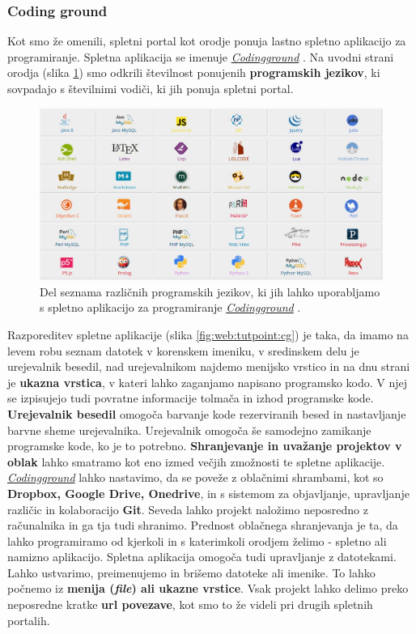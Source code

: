 \subsubsection{Coding ground}
\label{sec:coding_ground}

Kot smo že omenili, spletni portal kot orodje ponuja lastno spletno
aplikacijo za programiranje. Spletna aplikacija se imenuje
\emph{\href{http://www.tutorialspoint.com/codingground.htm}{Codingground}}
\cite{web:tutorialspoint:codingground}. Na uvodni strani orodja (slika
\ref{fig:web:tutpoint:cg-pl}) smo odkrili številnost ponujenih
\textbf{programskih jezikov}, ki sovpadajo s številnimi vodiči, ki jih
ponuja spletni portal.

\begin{figure}[h!]
  \centering
    \includegraphics [width=0.65\linewidth, keepaspectratio =
   1] {./images/sc_web/tutpoint_cg-pl-v01.jpg}
   \caption{Del seznama različnih programskih jezikov, ki jih lahko
     uporabljamo s spletno aplikacijo za programiranje
     \emph{\href{http://www.tutorialspoint.com/codingground.htm}{Codingground}}
     \cite{web:tutorialspoint:codingground}.}
    \label{fig:web:tutpoint:cg-pl}
\end{figure}

Razporeditev spletne aplikacije (slika \ref{fig:web:tutpoint:cg}) je
taka, da imamo na levem robu seznam datotek v korenskem imeniku, v
sredinskem delu je urejevalnik besedil, nad urejevalnikom najdemo
menijsko vrstico in na dnu strani je \textbf{ukazna vrstica}, v kateri
lahko zaganjamo napisano programsko kodo. V njej se izpisujejo tudi
povratne informacije tolmača in izhod programske
kode. \textbf{Urejevalnik besedil} omogoča barvanje kode
rezerviranih besed in nastavljanje barvne sheme
urejevalnika. Urejevalnik omogoča še samodejno zamikanje programske
kode, ko je to potrebno. \textbf{Shranjevanje in uvažanje projektov v
  oblak} lahko smatramo kot eno izmed večjih zmožnosti te spletne
aplikacije. \emph{\href{http://www.tutorialspoint.com/codingground.htm}{Codingground}}
lahko nastavimo, da se poveže z oblačnimi shrambami, kot so
\textbf{Dropbox, Google Drive, Onedrive}, in s sistemom za objavljanje,
upravljanje različic in kolaboracijo \textbf{Git}. Seveda lahko projekt
naložimo neposredno z računalnika in ga tja tudi
shranimo. Prednost oblačnega shranjevanja je ta, da lahko programiramo od kjerkoli in s katerimkoli orodjem želimo - spletno
ali namizno aplikacijo. Spletna aplikacija omogoča tudi upravljanje z
datotekami. Lahko ustvarimo, preimenujemo in brišemo datoteke ali
imenike. To lahko počnemo iz \textbf{menija (\emph{file}) ali ukazne
  vrstice}. Vsak projekt lahko delimo preko neposredne kratke
\textbf{url povezave}, kot smo to že videli pri drugih spletnih
portalih.

